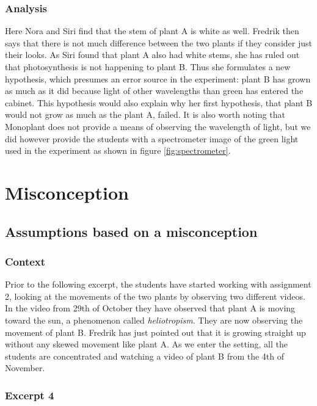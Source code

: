 \subsubsection*{Analysis}
Here Nora and Siri find that the stem of plant A is white as well. Fredrik then says that there is not much difference between the two plants if they consider just their looks. As Siri found that plant A also had white stems, she has ruled out that photosynthesis is not happening to plant B. Thus she formulates a new hypothesis, which presumes an error source in the experiment: plant B has grown as much as it did because light of other wavelengths than green has entered the cabinet.
This hypothesis would also explain why her first hypothesis, that plant B would not grow as much as the plant A, failed. It is also worth noting that Monoplant does not provide a means of observing the wavelength of light, but we did however provide the students with a spectrometer image of the green light used in the experiment as shown in figure \ref{fig:spectrometer}.

\section{Misconception}
\label{cha:guidedinquiry}


\subsection{Assumptions based on a misconception}

\subsubsection*{Context}
Prior to the following excerpt, the students have started working with assignment 2, looking at the movements of the two plants by observing two different videos. In the video from 29th of October they have observed that plant A is moving toward the sun, a phenomenon called \emph{heliotropism}. They are now observing the movement of plant B. Fredrik has just pointed out that it is growing straight up without any skewed movement like plant A. As we enter the setting, all the students are concentrated and watching a video of plant B from the 4th of November.


\subsubsection*{Excerpt 4}\label{ex:excerpt4}


